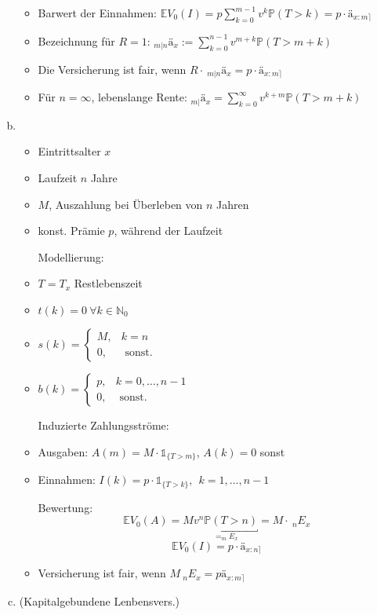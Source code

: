 \begin{enumerate}[(a)]
\begin{itemize}
		\item Barwert der Einnahmen: $\mathds{E}V_0(I)=p\sum_{k=0}^{m-1}v^k \mathds{P}(T>k)=p\cdot ä_{x:m\rceil}$ 
		\item Bezeichnung für $R=1$: $_{m|n}ä_x:=\sum_{k=0}^{n-1}v^{m+k}\mathds{P}(T>m+k)$
		\item Die Versicherung ist fair, wenn $R\cdot~ _{m|n}ä_x=p\cdot ä_{x:m\rceil}$
		\item Für $n=\infty$, lebenslange Rente: $_{m|}ä_x=\sum_{k=0}^{\infty}v^{k+m}\mathds{P}(T>m+k)$
	\end{itemize}
	\item {}\\
	\begin{itemize}
		\item Eintrittsalter $x$
		\item Laufzeit $n$ Jahre
		\item {} $M$, Auszahlung bei Überleben von $n$ Jahren
		\item konst. Prämie $p$, während der Laufzeit
		\item[Modellierung:]
		\item $T=T_x$ Restlebenszeit
		\item $t(k)=0~\forall k\in \mathds{N}_0$
		\item $s(k)=\left\{\begin{array}{cl} M, & k=n\\ 0, & \text{ sonst.} \end{array}\right.$
		\item $b(k)=\left\{\begin{array}{cl} p, & k=0,\dots,n-1 \\ 0, & \text{ sonst.}	\end{array}\right.$
		\item[Induzierte Zahlungsströme:]
		\item Ausgaben: $A(m)=M\cdot \mathbb{1}_{\{T>m\}}$, $A(k)=0$ sonst
		\item Einnahmen: $I(k)=p\cdot \mathbb{1}_{\{T>k\}},~~k=1,\dots,n-1$
		\item[Bewertung:]
		\[
		\mathds{E}V_0(A)= M \underbracket{v^n \mathds{P}(T>n)}_{= _mE_x}=M\cdot~_nE_x 
		\]		
		\[
		\mathds{E}V_0(I)= p\cdot ä_{x:n\rceil} 
		\]
		\item Versicherung ist fair, wenn $ M~_nE_x=pä_{x:m\rceil}$
	\end{itemize}
	\item {} (Kapitalgebundene Lenbensvers.)\\
	

\end{enumerate}
